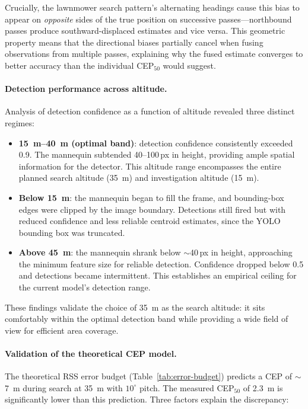 Crucially, the lawnmower search pattern's alternating headings cause this bias to appear on \emph{opposite} sides of the true position on successive passes---northbound passes produce southward-displaced estimates and vice versa.  This geometric property means that the directional biases partially cancel when fusing observations from multiple passes, explaining why the fused estimate converges to better accuracy than the individual CEP$_{50}$ would suggest.

\paragraph{Detection performance across altitude.}
Analysis of detection confidence as a function of altitude revealed three distinct regimes:

\begin{itemize}
  \item \textbf{\SIrange{15}{40}{\metre} (optimal band)}: detection confidence consistently exceeded 0.9.  The mannequin subtended 40--100\,px in height, providing ample spatial information for the detector.  This altitude range encompasses the entire planned search altitude (\SI{35}{\metre}) and investigation altitude (\SI{15}{\metre}).
  \item \textbf{Below \SI{15}{\metre}}: the mannequin began to fill the frame, and bounding-box edges were clipped by the image boundary.  Detections still fired but with reduced confidence and less reliable centroid estimates, since the YOLO bounding box was truncated.
  \item \textbf{Above \SI{45}{\metre}}: the mannequin shrank below $\sim$40\,px in height, approaching the minimum feature size for reliable detection.  Confidence dropped below 0.5 and detections became intermittent.  This establishes an empirical ceiling for the current model's detection range.
\end{itemize}

\noindent These findings validate the choice of \SI{35}{\metre} as the search altitude: it sits comfortably within the optimal detection band while providing a wide field of view for efficient area coverage.

\paragraph{Validation of the theoretical CEP model.}
The theoretical RSS error budget (Table~\ref{tab:error-budget}) predicts a CEP of $\sim$\SI{7}{\metre} during search at \SI{35}{\metre} with $10^{\circ}$ pitch.  The measured CEP$_{50}$ of \SI{2.3}{\metre} is significantly lower than this prediction.  Three factors explain the discrepancy:

